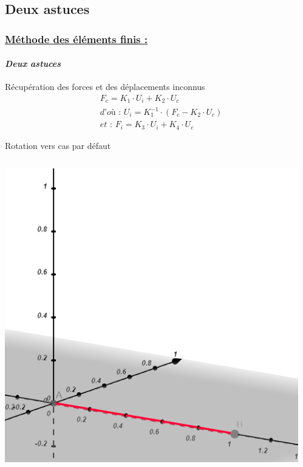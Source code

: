 \documentclass[10pt]{beamer}
\begin{document}
	\subsection{Deux astuces}
	\begin{frame}
		\frametitle{\uline{M\'ethode des \'el\'ements finis :}}
		\framesubtitle{\textit{Deux astuces}}
		\begin{block}{R\'ecup\'eration des forces et des d\'eplacements inconnus}
			\begin{align}
				&F_c = K_1 \cdot U_i + K_2 \cdot U_c\\
				&\textit{d'o\`u : } U_i = K_1^{-1} \cdot (F_c - K_2 \cdot U_c)\\
				&\textit{et : } F_i = K_3 \cdot U_i + K_4 \cdot U_c
			\end{align}
		\end{block}
		\begin{block}{Rotation vers cas par d\'efaut}
			\begin{columns}[t]
  				\begin{column}{5cm}
  					\centering
  					\includegraphics[scale=0.2]{Images/CasDeBase.png}
  				\end{column}
 				\begin{column}{5cm}
 				 	\centering

\end{column}
\end{columns}
\end{block}
\end{frame}
\end{document}
